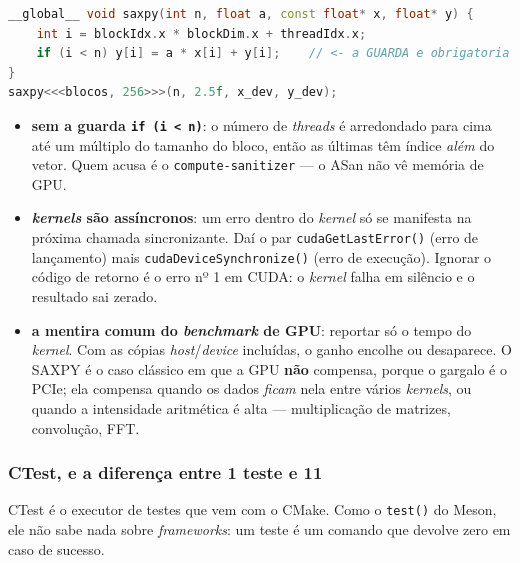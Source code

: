 \begin{lstlisting}[style=bt, language=C++,
    caption={O \emph{kernel} de \texttt{src/cmake/cuda\_saxpy.cu} (não compilado
             nesta máquina: não há \texttt{nvcc}).}]
__global__ void saxpy(int n, float a, const float* x, float* y) {
    int i = blockIdx.x * blockDim.x + threadIdx.x;
    if (i < n) y[i] = a * x[i] + y[i];    // <- a GUARDA e obrigatoria
}
saxpy<<<blocos, 256>>>(n, 2.5f, x_dev, y_dev);
\end{lstlisting}

\begin{armadilha}
\begin{itemize}
    \item \textbf{sem a guarda \texttt{if (i < n)}}: o número de \emph{threads}
          é arredondado para cima até um múltiplo do tamanho do bloco, então as
          últimas têm índice \emph{além} do vetor. Quem acusa é o
          \texttt{compute-sanitizer} --- o ASan não vê memória de GPU.
    \item \textbf{\emph{kernels} são assíncronos}: um erro dentro do
          \emph{kernel} só se manifesta na próxima chamada sincronizante. Daí o
          par \texttt{cudaGetLastError()} (erro de lançamento) mais
          \texttt{cudaDeviceSynchronize()} (erro de execução). Ignorar o código
          de retorno é o erro nº 1 em CUDA: o \emph{kernel} falha em silêncio e
          o resultado sai zerado.
    \item \textbf{a mentira comum do \emph{benchmark} de GPU}: reportar só o
          tempo do \emph{kernel}. Com as cópias \emph{host}/\emph{device}
          incluídas, o ganho encolhe ou desaparece. O SAXPY é o caso clássico em
          que a GPU \textbf{não} compensa, porque o gargalo é o PCIe; ela
          compensa quando os dados \emph{ficam} nela entre vários
          \emph{kernels}, ou quando a intensidade aritmética é alta ---
          multiplicação de matrizes, convolução, FFT.
\end{itemize}
\end{armadilha}

\subsubsection{CTest, e a diferença entre 1 teste e 11}

CTest é o executor de testes que vem com o CMake. Como o \texttt{test()} do
Meson, ele não sabe nada sobre \emph{frameworks}: um teste é um comando que
devolve zero em caso de sucesso.

